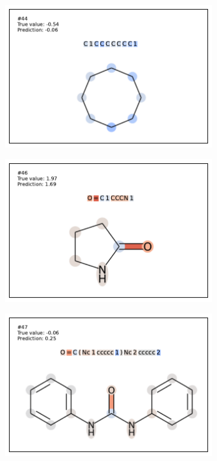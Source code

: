 \begin{figure}[h]
\centering
\begin{subfigure}[b]{0.33\textwidth} 
  \centering 
  \includegraphics[width=\textwidth]{figures/esol/esol44.pdf} 
\end{subfigure}\begin{subfigure}[b]{0.33\textwidth} 
  \centering 
  \includegraphics[width=\textwidth]{figures/esol/esol46.pdf} 
\end{subfigure}\begin{subfigure}[b]{0.33\textwidth} 
  \centering 
  \includegraphics[width=\textwidth]{figures/esol/esol47.pdf} 

\end{subfigure}
\end{figure}
